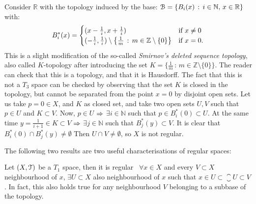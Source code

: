 \begin{example}
	Consider $\mathbb{R}$ with the topology induced by the base:
	$\EuScript{B}=\left\{B_i(x)\,:\,i\in\mathbb{N},\,x\in\mathbb{R}\right\}$ with:
	\[
		B_i^*(x)=\begin{cases}
					(x-\frac{1}{i},x+\frac{1}{i}) & \text{if } x\neq 0\\
					(-\frac{1}{i},\frac{1}{i})\setminus\left\{\frac{1}{m}\,:\,m\in\mathbb{Z}\setminus\{0\}\right\} & \text{if } x=0.
		\end{cases}
	\]
	This is a slight modification of the so-called \emph{Smirnov's deleted sequence topology}, also called $K$-topology after introducing the set $K=\{\frac{1}{m}\,:\,m\in\mathbb{Z}\setminus\{0\}\}$.
	The reader can check that this is a topology, and that it is Hausdorff.
	The fact that this is not a $T_3$ space can be checked by observing that the set $K$ is closed in the topology, but cannot be separated from the point $x=0$ by disjoint open sets.
	Let us take $p=0\in X$, and $K$ as closed set, and take two open sets $U,V$ such that $p\in U$ and $K\subset V$.
	Now, $p\in U$ $\Rightarrow$ $\exists i\in\mathbb{N}$ such that $p\in B_i^*(0)\subset U$.
	At the same time $y=\frac{1}{i+1}\in K\subset V$ $\Rightarrow$ $\exists j\in\mathbb{N}$ such that $B_j^*(y)\subset V$.
	It is clear that $B_i^*(0)\cap B_j^*(y)\neq\emptyset$
	Then $U\cap V\neq \emptyset$, so $X$ is not regular.
\end{example}

The following two results are two useful characterisations of regular spaces:

\begin{theorem}
	\label{th:regular-space-characterisation-1}
	Let $(X, \EuScript{T})$ be a $T_1$ space, then it is regular \iff\ $\forall x\in X$ and every $V\subset X$ neighbourhood of $x$, $\exists U\subset X$ also neighbourhood of $x$ such that $x\in U\subset \closure{U}\subset V$. In fact, this also holds true for any neighbourhood $V$ belonging to a subbase of the topology.
\end{theorem}

